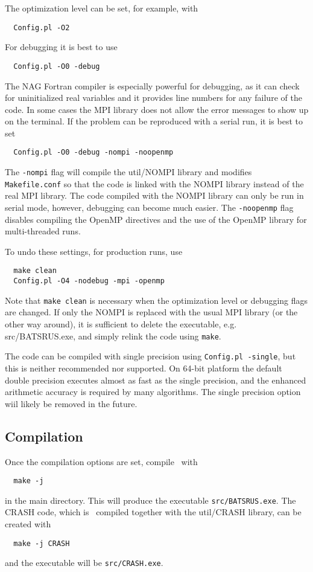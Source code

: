 The optimization level can be set, for example, with
\begin{verbatim}
  Config.pl -O2
\end{verbatim}
For debugging it is best to use
\begin{verbatim}
  Config.pl -O0 -debug
\end{verbatim}
The NAG Fortran compiler is especially powerful for debugging, 
as it can check for uninitialized real variables and it provides 
line numbers for any failure of the code.
In some cases the MPI library does not allow the error messages to show up
on the terminal. If the problem can be reproduced with a serial run, 
it is best to set
\begin{verbatim}
  Config.pl -O0 -debug -nompi -noopenmp
\end{verbatim}
The {\tt -nompi} flag will compile the util/NOMPI library and 
modifies {\tt Makefile.conf} so that the code is linked with
the NOMPI library instead of the real MPI library. 
The code compiled with the NOMPI library can only be
run in serial mode, however, debugging can become much easier.
The {\tt -noopenmp} flag disables compiling the OpenMP directives
and the use of the OpenMP library for multi-threaded runs.

To undo these settings, for production runs, use 
\begin{verbatim}
  make clean
  Config.pl -O4 -nodebug -mpi -openmp
\end{verbatim}
Note that {\tt make clean} is necessary when the optimization level 
or debugging flags are changed. If only the NOMPI is replaced with 
the usual MPI library (or the other way around), it is sufficient to
delete the executable, e.g. src/BATSRUS.exe, and simply relink the code
using {\tt make}.

The code can be compiled with single precision using {\tt Config.pl -single},
but this is neither recommended nor supported. On 64-bit platform the default
double precision executes almost as fast as the single precision, and the 
enhanced arithmetic accuracy is required by many algorithms.  
The single precision option wiil likely be removed in the future.

\subsection{Compilation}

Once the compilation options are set, compile \BATSRUS\ with
\begin{verbatim}
  make -j
\end{verbatim}
in the main directory. This will produce the executable 
{\tt src/BATSRUS.exe}. The CRASH code, which is \BATSRUS\
compiled together with the util/CRASH library, can be created with
\begin{verbatim}
  make -j CRASH
\end{verbatim}
and the executable will be {\tt src/CRASH.exe}. 

